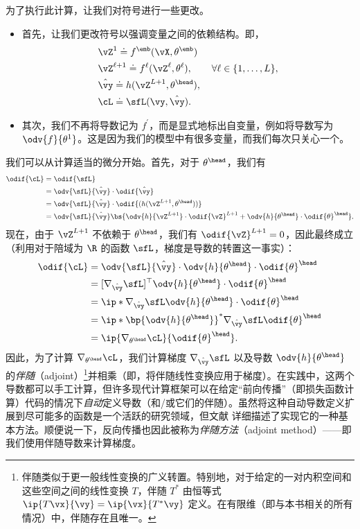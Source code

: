 \documentclass[../../book-main_zh.tex]{subfiles}
\begin{document}
为了执行此计算，让我们对符号进行一些更改。
\begin{itemize}
    \item 首先，让我们更改符号以强调变量之间的依赖结构。即，
        \begin{align}
            &\vZ^{1} \doteq f^{\emb}(\vX, \theta^{\emb}) \\
            &\vZ^{\ell + 1} \doteq f^{\ell}(\vZ^{\ell},
            \theta^{\ell}), \qquad \forall \ell \in \{1, \dots, L\}, \\
            &\hat{\vy} \doteq h(\vZ^{L+1}, \theta^{\head}), \\
            &\cL \doteq \sfL(\vy, \hat{\vy}).
        \end{align}
    \item 其次，我们不再将导数记为 \(f^{\prime}\)，而是显式地标出自变量，例如将导数写为 \(\odv{f}{\theta^{1}}\)。这是因为我们的模型中有很多变量，而我们每次只关心一个。
\end{itemize}
我们可以从计算适当的微分开始。首先，对于 \(\theta^{\head}\)，我们有
\begin{align}
    \odif{\cL}
    &= \odif{\sfL} \\
    &= \odv{\sfL}{\hat{\vy}}\cdot\odif{\hat{\vy}} \\
    &= \odv{\sfL}{\hat{\vy}}\cdot\odif{{(h(\vZ^{L + 1}, \theta^{\head}))}} \\
    &= \odv{\sfL}{\hat{\vy}}\bs{\odv{h}{\vZ^{L +
        1}}\cdot\odif{\vZ}^{L + 1} +
    \odv{h}{\theta^{\head}}\cdot\odif{\theta}^{\head}}.
\end{align}
现在，由于 \(\vZ^{L + 1}\) 不依赖于 \(\theta^{\head}\)，我们有 \(\odif{\vZ}^{L + 1} = 0\)，因此最终成立（利用对于陪域为 \(\R\) 的函数 \(\sfL\)，梯度是导数的转置这一事实）：
\begin{align}
    \odif{\cL}
    &=
    \odv{\sfL}{\hat{\vy}}\cdot\odv{h}{\theta^{\head}}\cdot\odif{\theta}^{\head}
    \\
    &=
    [\nabla_{\hat{\vy}}\sfL]^{\top}\odv{h}{\theta^{\head}}\cdot\odif{\theta}^{\head}
    \\
    &=
    \ip*{\nabla_{\hat{\vy}}\sfL}{\odv{h}{\theta^{\head}}\cdot\odif{\theta}^{\head}}
    \\
    &=
    \ip*{\bp{\odv{h}{\theta^{\head}}}^{*}\nabla_{\hat{\vy}}\sfL}{\odif{\theta}^{\head}}
    \\
    &= \ip{\nabla_{\theta^{\head}}\cL}{\odif{\theta}^{\head}}.
\end{align}
因此，为了计算 \(\nabla_{\theta^{\head}}\cL\)，我们计算梯度 \(\nabla_{\hat{\vy}}\sfL\) 以及导数 \(\odv{h}{\theta^{\head}}\) 的\textit{伴随}（adjoint）\footnote{伴随类似于更一般线性变换的广义转置。特别地，对于给定的一对内积空间和这些空间之间的线性变换 \(T\)，伴随 \(T^{*}\) 由恒等式 \(\ip{T\vx}{\vy} = \ip{\vx}{T^{*}\vy}\) 定义。在有限维（即与本书相关的所有情况）中，伴随存在且唯一。}并相乘（即，将伴随线性变换应用于梯度）。在实践中，这两个导数都可以手工计算，但许多现代计算框架可以在给定“前向传播”（即损失函数计算）代码的情况下\textit{自动}定义导数（和/或它们的伴随）。虽然将这种自动导数定义扩展到尽可能多的函数是一个活跃的研究领域，但文献 \cite{bright2025matrix} 详细描述了实现它的一种基本方法。顺便说一下，反向传播也因此被称为\textit{伴随方法}（adjoint method）——即我们使用伴随导数来计算梯度。
\end{document}
